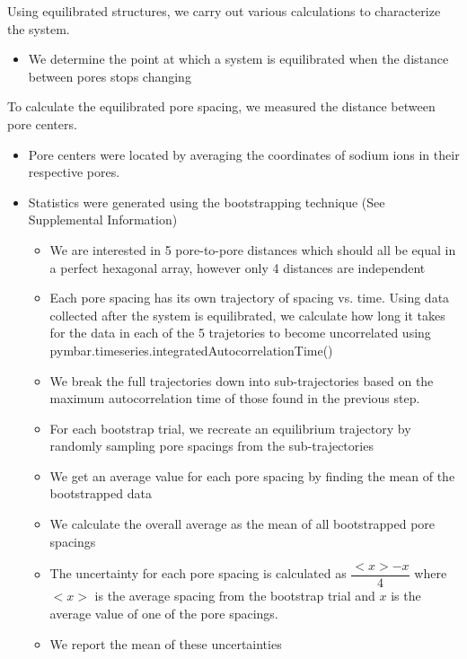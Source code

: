 \documentclass{article}
\begin{document}

  Using equilibrated structures, we carry out various calculations to characterize the
  system. 
  \begin{itemize}
	\item We determine the point at which a system is equilibrated when the 
        distance between pores stops changing
  \end{itemize}

  To calculate the equilibrated pore spacing, we measured the distance between pore
  centers.
  \begin{itemize}
	\item Pore centers were located by averaging the coordinates of sodium ions in their
	respective pores.
	\item Statistics were generated using the bootstrapping technique (See Supplemental Information)
        \begin{itemize}
	        \item We are interested in 5 pore-to-pore distances which should all be equal in
	        a perfect hexagonal array, however only 4 distances are independent %
	        \item Each pore spacing has its own trajectory of spacing vs. time. Using data collected after
	        the system is equilibrated, we calculate how long it takes for the data in each of the 5
	        trajetories to become uncorrelated using pymbar.timeseries.integratedAutocorrelationTime() %
	        \item We break the full trajectories down into sub-trajectories based on the
	        maximum autocorrelation time of those found in the previous step.
	        \item For each bootstrap trial, we recreate an equilibrium trajectory by randomly
	        sampling pore spacings from the sub-trajectories
	        \item We get an average value for each pore spacing by finding the mean of the bootstrapped data
	        \item We calculate the overall average as the mean of all bootstrapped pore spacings
	        \item The uncertainty for each pore spacing is calculated as $\dfrac{<x> - x}{4}$ where $<x>$ is the
	        average spacing from the bootstrap trial and $x$ is the average value of one of the pore spacings.
	        \item We report the mean of these uncertainties
        \end{itemize}
  \end{itemize}
\end{document}
